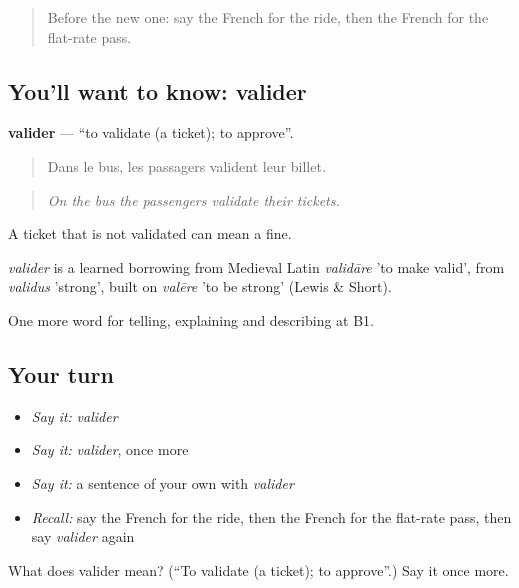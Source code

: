 \label{lesson:FR-C412-valider}



\begin{quote}
Before the new one: say the French for the ride, then the French for the flat-rate pass.
\end{quote}

\subsection*{You'll want to know: valider}
\textbf{valider} — \textquotedblleft{}to validate (a ticket); to approve\textquotedblright{}.

\begin{quote}
Dans le bus, les passagers valident leur billet.
\end{quote}

\begin{quote}
\emph{On the bus the passengers validate their tickets.}
\end{quote}

A ticket that is not validated can mean a fine.

\begin{cousinweb}
\emph{valider} is a learned borrowing from Medieval Latin \emph{validāre} 'to make valid', from \emph{validus} 'strong', built on \emph{valēre} 'to be strong' (Lewis \& Short).
\end{cousinweb}

\begin{grammarlens}[title={What you've built}]
One more word for telling, explaining and describing at B1.
\end{grammarlens}

\subsection*{Your turn}
\begin{itemize}
\raggedright
  \item \emph{Say it:} \emph{valider}
  \item \emph{Say it:} \emph{valider}, once more
  \item \emph{Say it:} a sentence of your own with \emph{valider}
  \item \emph{Recall:} say the French for the ride, then the French for the flat-rate pass, then say \emph{valider} again
\end{itemize}

\begin{tcolorbox}[breakable,colback=teal!4,colframe=teal!35!black,title={Before you move on}]
What does valider mean? (\textquotedblleft{}To validate (a ticket); to approve\textquotedblright{}.) Say it once more.
\end{tcolorbox}
